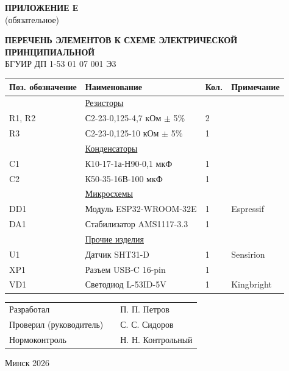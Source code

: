 \newpage
\begin{flushright}
    {\bfseries ПРИЛОЖЕНИЕ Е} \\
    (обязательное)
\end{flushright}

\begin{center}
    {\bfseries ПЕРЕЧЕНЬ ЭЛЕМЕНТОВ К СХЕМЕ ЭЛЕКТРИЧЕСКОЙ ПРИНЦИПИАЛЬНОЙ} \\
    \vspace{0.2cm}
    БГУИР ДП 1-53 01 07 001 Э3
\end{center}


\vspace{0.5cm}

\begin{center}
\begin{tabular}{|p{2.5cm}|p{8cm}|p{1.5cm}|p{3cm}|}
\hline
\centering \textbf{Поз. обозначение} & \centering \textbf{Наименование} & \centering \textbf{Кол.} & \textbf{Примечание} \\ \hline
& \underline{Резисторы} & & \\ 
R1, R2 & С2-23-0,125-4,7 кОм $\pm$ 5\% & 2 & \\ \hline
R3 & С2-23-0,125-10 кОм $\pm$ 5\% & 1 & \\ \hline
& \underline{Конденсаторы} & & \\ 
C1 & К10-17-1а-Н90-0,1 мкФ & 1 & \\ \hline
C2 & К50-35-16В-100 мкФ & 1 & \\ \hline
& \underline{Микросхемы} & & \\ 
DD1 & Модуль ESP32-WROOM-32E & 1 & Espressif \\ \hline
DA1 & Стабилизатор AMS1117-3.3 & 1 & \\ \hline
& \underline{Прочие изделия} & & \\ 
U1 & Датчик SHT31-D & 1 & Sensirion \\ \hline
XP1 & Разъем USB-C 16-pin & 1 & \\ \hline
VD1 & Светодиод L-53ID-5V & 1 & Kingbright \\ \hline
\end{tabular}
\end{center}

\vspace{1cm}

\begin{flushleft}
    \begin{tabular}{p{6cm} p{4cm} l}
        Разработал & \underline{\hspace{3cm}} & П. П. Петров \\
        Проверил (руководитель) & \underline{\hspace{3cm}} & С. С. Сидоров \\
        Нормоконтроль & \underline{\hspace{3cm}} & Н. Н. Контрольный
    \end{tabular}
\end{flushleft}

\vfill
\begin{center}
    Минск 2026
\end{center}

\newpage